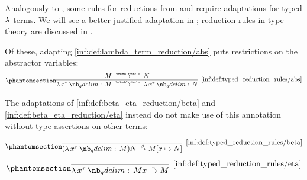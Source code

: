\begin{definition}\label{def:typed_reduction_rules}
  Analogously to , some rules for reductions from  and  require adaptations for \hyperref[def:typed_lambda_term]{typed \( \mathrm{\lambda} \)-terms}. We will see a better justified adaptation in ; reduction rules in type theory are discussed in .

  Of these, adapting \ref{inf:def:lambda_term_reduction/abs} puts restrictions on the abstractor variables:
  \begin{equation*}\taglabel[\ensuremath{ \logic{Abs}_{\Anon}^{\T{tt}} }]{inf:def:typed_reduction_rules/abs}
    \begin{prooftree}
      \hypo{ M \pred N }
      \infer1[\ref{inf:def:typed_reduction_rules/abs}]{ \qabs {x^\tau} M \pred \qabs {x^\tau} N }.
    \end{prooftree}
  \end{equation*}

  The adaptations of \ref{inf:def:beta_eta_reduction/beta} and \ref{inf:def:beta_eta_reduction/eta} instead do not make use of this annotation without type assertions on other terms:
  \begin{paracol}{2}
    \begin{leftcolumn}
      \begin{equation*}\taglabel[\ensuremath{ \logic{Red}_\beta^{\T{tt}} }]{inf:def:typed_reduction_rules/beta}
        \begin{prooftree}
          \infer0[\ref{inf:def:typed_reduction_rules/beta}]{ (\qabs {x^\tau} M) N \bred M[x \mapsto N] }.
        \end{prooftree}
      \end{equation*}
    \end{leftcolumn}

    \begin{rightcolumn}
      \begin{equation*}\taglabel[\ensuremath{ \logic{Par}_\eta^{\T{tt}} }]{inf:def:typed_reduction_rules/eta}
        \begin{prooftree}
          \infer0[\ref{inf:def:typed_reduction_rules/eta}]{ \qabs {x^\tau} M x \ered M }.
        \end{prooftree}
      \end{equation*}
    \end{rightcolumn}
  \end{paracol}
\end{definition}

